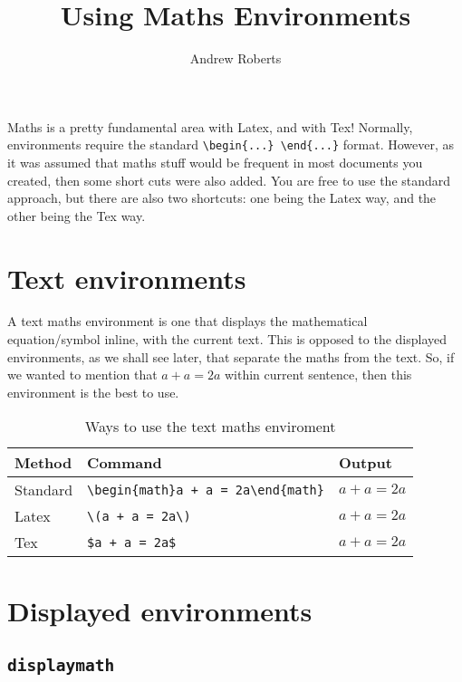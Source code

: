 \documentclass[a4paper]{article}
\begin{document}
\title{Using Maths Environments}
\author{Andrew Roberts}
\date{}
\maketitle

Maths is a pretty fundamental area with Latex, and with Tex! Normally,
environments require the standard \verb|\begin{...} \end{...}| format.
However, as it was assumed that maths stuff would be frequent in most
documents you created, then some short cuts were also added. You are
free to use the standard approach, but there are also two shortcuts: one
being the Latex way, and the other being the Tex way. 

\section{Text environments}

A text maths environment is one that displays the mathematical
equation/symbol inline, with the current text. This is opposed to the
displayed environments, as we shall see later, that separate the maths
from the text. So, if we wanted to mention that \(a + a = 2a\) within
current sentence, then this environment is the best to use.

\begin{table}[!htp]
\begin{tabular}{|l|l|l|}
\hline
  Method & Command & Output \\ \hline
  Standard & \verb|\begin{math}a + a = 2a\end{math}| & \begin{math}a + a = 2a\end{math} \\ \hline
  Latex & \verb|\(a + a = 2a\)| & \(a + a = 2a\) \\ \hline
  Tex & \verb|$a + a = 2a$| & $a + a = 2a$ \\ \hline
\end{tabular}
\caption{Ways to use the text maths enviroment}
\end{table}

\section{Displayed environments}

\subsection{\texttt{displaymath}}
\end{document}
